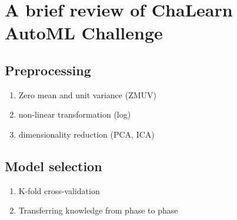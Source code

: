 \section{A
brief
review
of
ChaLearn
AutoML
Challenge
\cite{guyon2016brief}}

\subsection{Preprocessing}
\begin{enumerate}
  \item
    Zero
    mean
    and
    unit
    variance
    (ZMUV)
  \item
    non-linear
    transformation
    (log)
  \item
    dimensionality
    reduction
    (PCA,
    ICA)
\end{enumerate}

\subsection{Model
selection}
\begin{enumerate}
  \item
    K-fold
    cross-validation
  \item
    Transferring
    knowledge
    from
    phase
    to
    phase
\end{enumerate}

